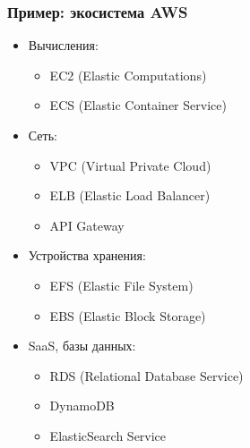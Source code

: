 \documentclass{../../slides-style}
\begin{document}
    \begin{frame}
        \frametitle{Пример: экосистема AWS}
        \begin{itemize}
            \item Вычисления:
            \begin{itemize}
                \item EC2 (Elastic Computations)
                \item ECS (Elastic Container Service)
            \end{itemize}
            \item Сеть:
            \begin{itemize}
                \item VPC (Virtual Private Cloud)
                \item ELB (Elastic Load Balancer)
                \item API Gateway
            \end{itemize}
            \item Устройства хранения:
            \begin{itemize}
                \item EFS (Elastic File System)
                \item EBS (Elastic Block Storage)
            \end{itemize}
            \item SaaS, базы данных:
            \begin{itemize}
                \item RDS (Relational Database Service)
                \item DynamoDB
                \item ElasticSearch Service
            \end{itemize}
        \end{itemize}
    \end{frame}
\end{document}
